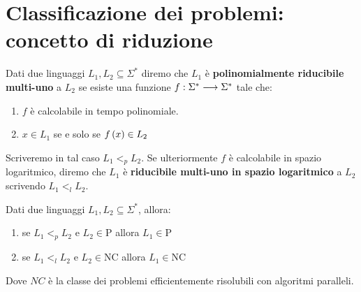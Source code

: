 \documentclass{lectures}
\begin{document}
\section{Classificazione dei problemi: concetto di riduzione} 
\begin{multicols}{2}
\begin{definition}
    Dati due linguaggi \(L_1, L_2 \subseteq \Sigma^*\) diremo che \(L_1\) è \textbf{polinomialmente riducibile multi-uno} a \(L_2\) se esiste una funzione \(f:\Sigma^*\longrightarrow \Sigma^*\) tale che:
    \begin{enumerate}
        \item \(f\) è calcolabile in tempo polinomiale.
        \item \(x \in L_1\) se e solo se \(f\left(x\right) \in L_2\)
    \end{enumerate}
    Scriveremo in tal caso \(L_1 <_p L_2\). Se ulteriormente \(f\) è calcolabile in spazio logaritmico, diremo che \(L_1\) è \textbf{riducibile multi-uno in spazio logaritmico} a \(L_2\) scrivendo \(L_1 <_l L_2\).
\end{definition}
\begin{theorem}
    Dati due linguaggi \(L_1, L_2 \subseteq \Sigma^*\), allora:
    \begin{enumerate}
        \item se \(L_1 <_p L_2\) e \(L_2 \in \text{P}\) allora \(L_1 \in \text{P}\)
        \item se \(L_1 <_l L_2\) e \(L_2 \in \text{NC}\) allora \(L_1 \in \text{NC}\)
    \end{enumerate}
    Dove \(NC\) è la classe dei problemi efficientemente risolubili con algoritmi paralleli.
\end{theorem}
\end{multicols}
\clearpage
\end{document}
